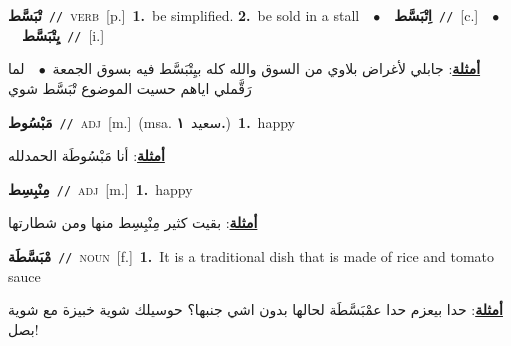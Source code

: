 \documentclass[10pt,a4paper,twoside]{article} %
\begin{document}
\begin{multicols}{2}
{\setlength\topsep{0pt}\textbf{\foreignlanguage{arabic}{تْبَسَّط}}\ {\color{gray}\texttt{//}\color{black}}\ \textsc{verb}\ [p.]\ \textbf{1.}~be simplified.  \textbf{2.}~be sold in a stall\ \ $\bullet$\ \ \setlength\topsep{0pt}\textbf{\foreignlanguage{arabic}{اِتْبَسَّط}}\ {\color{gray}\texttt{//}\color{black}}\ [c.]\ \ $\bullet$\ \ \setlength\topsep{0pt}\textbf{\foreignlanguage{arabic}{يِتْبَسَّط}}\ {\color{gray}\texttt{//}\color{black}}\ [i.]\  \begin{flushright}\color{gray}\foreignlanguage{arabic}{\textbf{\underline{\foreignlanguage{arabic}{أمثلة}}}: جابلي لأغراض بلاوي من السوق والله كله بيِتْبَسَّط فيه بسوق الجمعة\ $\bullet$\ \  لما رَقَّملي اياهم حسيت الموضوع تْبَسَّط شوي}\end{flushright}\color{black}} \vspace{2mm}

{\setlength\topsep{0pt}\textbf{\foreignlanguage{arabic}{مَبْسُوط}}\ {\color{gray}\texttt{//}\color{black}}\ \textsc{adj}\ [m.]\ \color{gray}(msa. \foreignlanguage{arabic}{سعيد}~\foreignlanguage{arabic}{\textbf{١.}})\color{black}\ \textbf{1.}~happy\  \begin{flushright}\color{gray}\foreignlanguage{arabic}{\textbf{\underline{\foreignlanguage{arabic}{أمثلة}}}: أنا مَبْسُوطَة الحمدلله}\end{flushright}\color{black}} \vspace{2mm}

{\setlength\topsep{0pt}\textbf{\foreignlanguage{arabic}{مِنْبِسِط}}\ {\color{gray}\texttt{//}\color{black}}\ \textsc{adj}\ [m.]\ \textbf{1.}~happy\  \begin{flushright}\color{gray}\foreignlanguage{arabic}{\textbf{\underline{\foreignlanguage{arabic}{أمثلة}}}: بقيت كثير مِنْبِسِط منها ومن شطارتها}\end{flushright}\color{black}} \vspace{2mm}

{\setlength\topsep{0pt}\textbf{\foreignlanguage{arabic}{مْبَسَّطَة}}\ {\color{gray}\texttt{//}\color{black}}\ \textsc{noun}\ [f.]\ \textbf{1.}~It is a traditional dish that is made of rice and tomato sauce\  \begin{flushright}\color{gray}\foreignlanguage{arabic}{\textbf{\underline{\foreignlanguage{arabic}{أمثلة}}}: حدا بيعزم حدا عمْبَسَّطَة لحالها بدون اشي جنبها؟ حوسيلك شوية خبيزة مع شوية بصل!}\end{flushright}\color{black}} \vspace{2mm}


\end{multicols}
\end{document}
